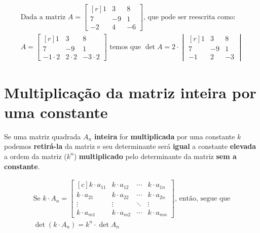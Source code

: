 \Example

\begin{gather*}
    \text{Dada a matriz }A=\begin{bmatrix*}[r]
        1 & 3 & 8\\
        7 & -9 & 1\\
        -2 & 4 & -6
    \end{bmatrix*} \text{, que pode ser reescrita como:}\\
    A=\begin{bmatrix*}[r]
        1 & 3 & 8\\
        7 & -9 & 1\\
        -1\cdot2 & 2\cdot2 & -3\cdot2
    \end{bmatrix*} 
    \text{ temos que }\det A= 2\cdot 
    \begin{vmatrix*}[r]
        1 & 3 & 8\\
        7 & -9 & 1\\
        -1 & 2 & -3
    \end{vmatrix*}
\end{gather*}

\section{Multiplicação da matriz inteira por uma constante}
Se uma matriz quadrada $A_n$ \textbf{inteira} for \textbf{multiplicada} por uma constante $k$ podemos \textbf{retirá-la} da matriz e seu determinante será \textbf{igual} a constante \textbf{elevada} a ordem da matriz ($k^n$) \textbf{multiplicado} pelo determinante da matriz \textbf{sem a constante}.

\begin{gather*}
    \text{Se } k\cdot A_n=\begin{bmatrix*}[c]
        k\cdot a_{11} & k\cdot a_{12} & \cdots & k\cdot a_{1n} \\
        k\cdot a_{21} & k\cdot a_{22} & \cdots & k\cdot a_{2n} \\
        \vdots  & \vdots & \ddots & \vdots  \\
        k\cdot a_{m1} & k\cdot a_{m2} & \cdots & k\cdot a_{mn}
    \end{bmatrix*} 
    \text{, então, segue que} \\[0.5em]
    \det (k \cdot A_n) = k^n \cdot \det A_n
\end{gather*}

\Example

